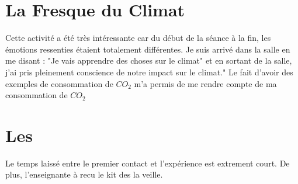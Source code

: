 \section{La Fresque du Climat}

Cette activité a été très intéressante car du début de la séance à la fin, les émotions ressenties étaient totalement différentes.
Je suis arrivé dans la salle en me disant : "Je vais apprendre des choses sur le climat" et en sortant de la salle, j'ai pris
pleinement conscience de notre impact sur le climat." Le fait d'avoir des exemples de consommation de $CO_2$ m'a permis de me rendre 
compte de ma consommation de $CO_2$


\section{Les \pd}

Le temps laissé entre le premier contact et l'expérience est extrement court. 
De plus, l'enseignante à recu le kit des \pd la veille.
